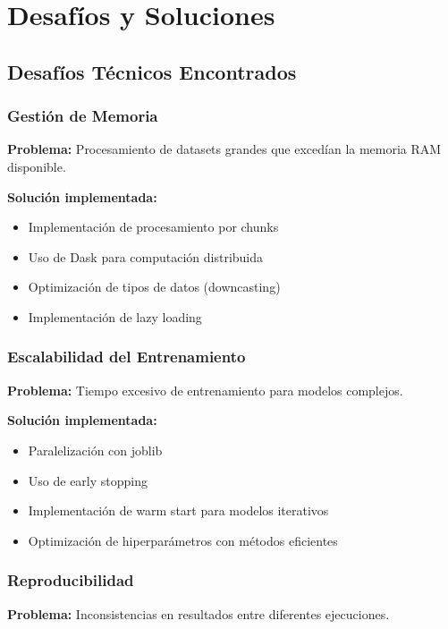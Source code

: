 \section{Desafíos y Soluciones}

\subsection{Desafíos Técnicos Encontrados}

\subsubsection{Gestión de Memoria}

\textbf{Problema:} Procesamiento de datasets grandes que excedían la memoria RAM disponible.

\textbf{Solución implementada:}
\begin{itemize}
    \item Implementación de procesamiento por chunks
    \item Uso de Dask para computación distribuida
    \item Optimización de tipos de datos (downcasting)
    \item Implementación de lazy loading
\end{itemize}

\subsubsection{Escalabilidad del Entrenamiento}

\textbf{Problema:} Tiempo excesivo de entrenamiento para modelos complejos.

\textbf{Solución implementada:}
\begin{itemize}
    \item Paralelización con joblib
    \item Uso de early stopping
    \item Implementación de warm start para modelos iterativos
    \item Optimización de hiperparámetros con métodos eficientes
\end{itemize}

\subsubsection{Reproducibilidad}

\textbf{Problema:} Inconsistencias en resultados entre diferentes ejecuciones.

